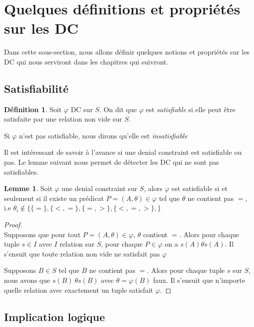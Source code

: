 \documentclass[letterpaper, 12pt]{report}
\theoremstyle{definition}
\newtheorem{mydef}{Définition}
\newtheorem{mylemma}{Lemme}
\newcommand{\alinea}{
\hspace*{0.5cm}}
\begin{document}
\section{Quelques définitions et propriétés sur les DC}

Dans cette sous-section, nous allons définir quelques notions et propriétés sur les DC qui nous serviront dans les chapitres qui suivront.

\subsection{Satisfiabilité}

\begin{mydef}
Soit $\varphi$ DC sur $S$. On dit que $\varphi$ est \emph{satisfiable} si elle peut être satisfaite par une relation non vide sur $S$.

Si $\varphi$ n'est pas satisfiable, nous dirons qu'elle est \emph{insatisfiable} 
\end{mydef}

Il est intéressant de savoir à l'avance si une denial constraint est satisfiable ou pas. Le lemme suivant nous permet de détecter les DC qui ne sont pas satisfiables.

\begin{mylemma}\label{satisLemma}
	Soit $\varphi$ une denial constraint sur $S$, alors $\varphi$ est satisfiable si et seulement si il existe un prédicat $P = (A,\theta)  \in \varphi$ tel que $\theta$ ne contient pas $=$, i.e $\theta_i \not\in \{ \{=\},\{<,=\},\{=,>\},\{<,=,>\},\} $ 
\end{mylemma}
\begin{proof}~\\
\alinea \framebox{$\implies$} Supposons que pour tout $P=(A,\theta) \in \varphi$, $\theta$ contient $=$. Alors pour chaque tuple $s \in I$ avec $I$ relation sur $S$, pour chaque $P \in \varphi$ on a $s(A) \theta s(A)$. Il s'ensuit que toute relation non vide ne satisfait pas $\varphi$

\framebox{$\impliedby$} Supposons $B \in S$ tel que $B$ ne contient pas $=$. Alors pour chaque tuple $s$ sur $S$, nous avons que $s(B)\ \theta s(B)$ avec $\theta=\varphi(B)$ faux. Il s'ensuit que n'importe quelle relation avec exactement un tuple satisfait $\varphi$.

\end{proof}


\subsection{Implication logique}
\end{document}
